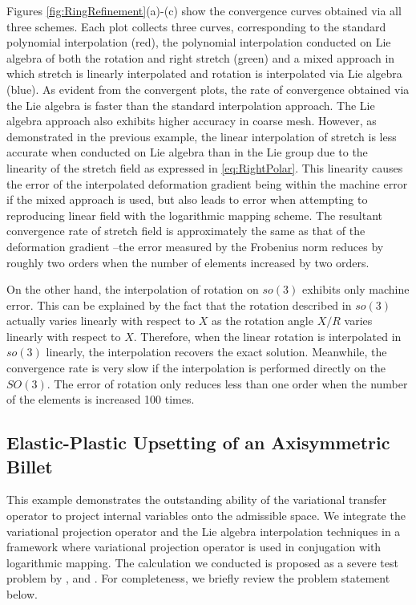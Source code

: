 \documentclass[12pt]{article}
\begin{document}
Figures \ref{fig:RingRefinement}(a)-(c) show the convergence curves
obtained via all three schemes.  Each plot collects three curves,
corresponding to the standard polynomial interpolation (red), the
polynomial interpolation conducted on Lie algebra of both the rotation
and right stretch (green) and a mixed approach in which stretch is
linearly interpolated and rotation is interpolated via Lie algebra
(blue).  As evident from the convergent plots, the rate of convergence
obtained via the Lie algebra is faster than the standard interpolation
approach. The Lie algebra approach also exhibits higher accuracy in
coarse mesh. However, as demonstrated in the previous example, the
linear interpolation of stretch is less accurate when conducted on Lie
algebra than in the Lie group due to the linearity of the stretch
field as expressed in \eqref{eq:RightPolar}. This linearity causes the
error of the interpolated deformation gradient being within the
machine error if the mixed approach is used, but also leads to error
when attempting to reproducing linear field with the logarithmic
mapping scheme. The resultant convergence rate of stretch field is
approximately the same as that of the deformation gradient --the error
measured by the Frobenius norm reduces by roughly two orders when the
number of elements increased by two orders.

On the other hand, the interpolation of rotation on $so(3)$ exhibits
only machine error. This can be explained by the fact that the
rotation described in $so(3)$ actually varies linearly with respect to
$X$ as the rotation angle $X/R$ varies linearly with respect to
$X$. Therefore, when the linear rotation is interpolated in $so(3)$
linearly, the interpolation recovers the exact solution. Meanwhile,
the convergence rate is very slow if the interpolation is performed
directly on the $SO(3)$. The error of rotation only reduces less than
one order when the number of the elements is increased 100 times.

\subsection{Elastic-Plastic Upsetting of an Axisymmetric Billet}
This example demonstrates the outstanding ability of the variational
transfer operator to project internal variables onto the admissible
space. We integrate the variational projection operator and the Lie
algebra interpolation techniques in a framework where variational projection operator is
used in conjugation with logarithmic mapping.  The calculation we
conducted is proposed as a severe test problem by \citet{Krieg.Krieg:1977}, 
\citet{Taylor.Becker:1983} and \citet{Simo.Hughes:1998}. For
completeness, we briefly review the problem statement below.
\end{document}
